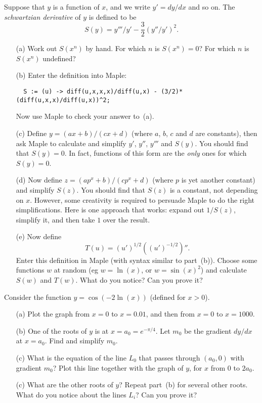 \documentclass[a4paper,10pt]{amsbook}
\numberwithin{example}{chapter}
\begin{document}
\begin{exercise}\label{ex-schwartzian}
 Suppose that $y$ is a function of $x$, and we write $y'=dy/dx$ and so
 on.  The \emph{schwartzian derivative} of $y$ is defined to be
 \[ S(y) = y'''/y' - \frac{3}{2}(y''/y')^2. \]
 \begin{itemize}
  \item[(a)] Work out $S(x^n)$ by hand.  For which $n$ is $S(x^n)=0$? 
   For which $n$ is $S(x^n)$ undefined? 
  \item[(b)] Enter the definition into Maple:
\begin{verbatim}
  S := (u) -> diff(u,x,x,x)/diff(u,x) - (3/2)*(diff(u,x,x)/diff(u,x))^2;
\end{verbatim}
   Now use Maple to check your answer to~(a). 
  \item[(c)] Define $y=(ax+b)/(cx+d)$ (where $a$, $b$, $c$ and $d$ are
   constants), then ask Maple to calculate and simplify $y'$, $y''$,
   $y'''$ and $S(y)$.  You should find that $S(y)=0$.  In fact,
   functions of this form are the \emph{only} ones for which $S(y)=0$. 
  \item[(d)] Now define $z=(ap^x+b)/(cp^x+d)$ (where $p$ is yet
   another constant) and simplify $S(z)$.  You should find that $S(z)$
   is a constant, not depending on $x$.  However, some creativity is
   required to persuade Maple to do the right simplifications.  Here
   is one approach that works: expand out $1/S(z)$, simplify it, and
   then take $1$ over the result. 
  \item[(e)] Now define 
   \[ T(u) = (u')^{1/2} ((u')^{-1/2})''. \] Enter this
   definition in Maple (with syntax similar to part~(b)). 
   Choose some functions $w$ at random (eg $w=\ln(x)$, or
   $w=\sin(x)^2$) and calculate $S(w)$ and $T(w)$.  What do
   you notice?  Can you prove it? 
 \end{itemize}
\end{exercise}

\begin{exercise}
 Consider the function $y=\cos(-2\ln(x))$ (defined for $x>0$).
 \begin{itemize}
  \item[(a)] Plot the graph from $x=0$ to $x=0.01$, and then from
   $x=0$ to $x=1000$.
  \item[(b)] One of the roots of $y$ is at $x=a_0=e^{-\pi/4}$.  Let
   $m_0$ be the gradient $dy/dx$ at $x=a_0$.  Find and simplify
   $m_0$.  
  \item[(c)] What is the equation of the line $L_0$ that passes
   through $(a_0,0)$ with gradient $m_0$?  Plot this line together
   with the graph of $y$, for $x$ from $0$ to $2a_0$.
  \item[(c)] What are the other roots of $y$?  Repeat part~(b) for
   several other roots.  What do you notice about the lines $L_i$?
   Can you prove it?
 \end{itemize}
\end{exercise}
\end{document}
